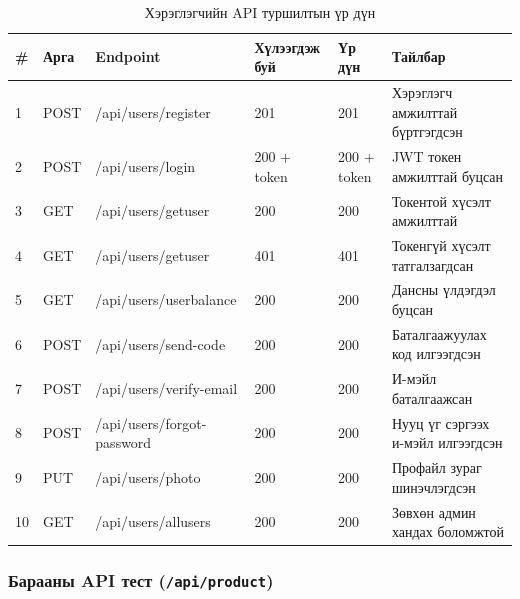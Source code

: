 \begin{table}[htbp]
\centering
\caption{Хэрэглэгчийн API туршилтын үр дүн}
\label{tab:user-api}
\begin{tabular}{|p{}|p{}|p{}|p{}|p{}|p{}|}
\hline
\textbf{\#} & \textbf{Арга} & \textbf{Endpoint} & \textbf{Хүлээгдэж буй} & \textbf{Үр дүн} & \textbf{Тайлбар} \\
\hline
1 & POST & /api/users/register & 201 & 201 & Хэрэглэгч амжилттай бүртгэгдсэн \\
\hline
2 & POST & /api/users/login & 200 + token & 200 + token & JWT токен амжилттай буцсан \\
\hline
3 & GET & /api/users/getuser & 200 & 200 & Токентой хүсэлт амжилттай \\
\hline
4 & GET & /api/users/getuser & 401 & 401 & Токенгүй хүсэлт татгалзагдсан \\
\hline
5 & GET & /api/users/userbalance & 200 & 200 & Дансны үлдэгдэл буцсан \\
\hline
6 & POST & /api/users/send-code & 200 & 200 & Баталгаажуулах код илгээгдсэн \\
\hline
7 & POST & /api/users/verify-email & 200 & 200 & И-мэйл баталгаажсан \\
\hline
8 & POST & /api/users/forgot-password & 200 & 200 & Нууц үг сэргээх и-мэйл илгээгдсэн \\
\hline
9 & PUT & /api/users/photo & 200 & 200 & Профайл зураг шинэчлэгдсэн \\
\hline
10 & GET & /api/users/allusers & 200 & 200 & Зөвхөн админ хандах боломжтой \\
\hline
\end{tabular}
\end{table}

\subsubsection{Барааны API тест (\texttt{/api/product})}

